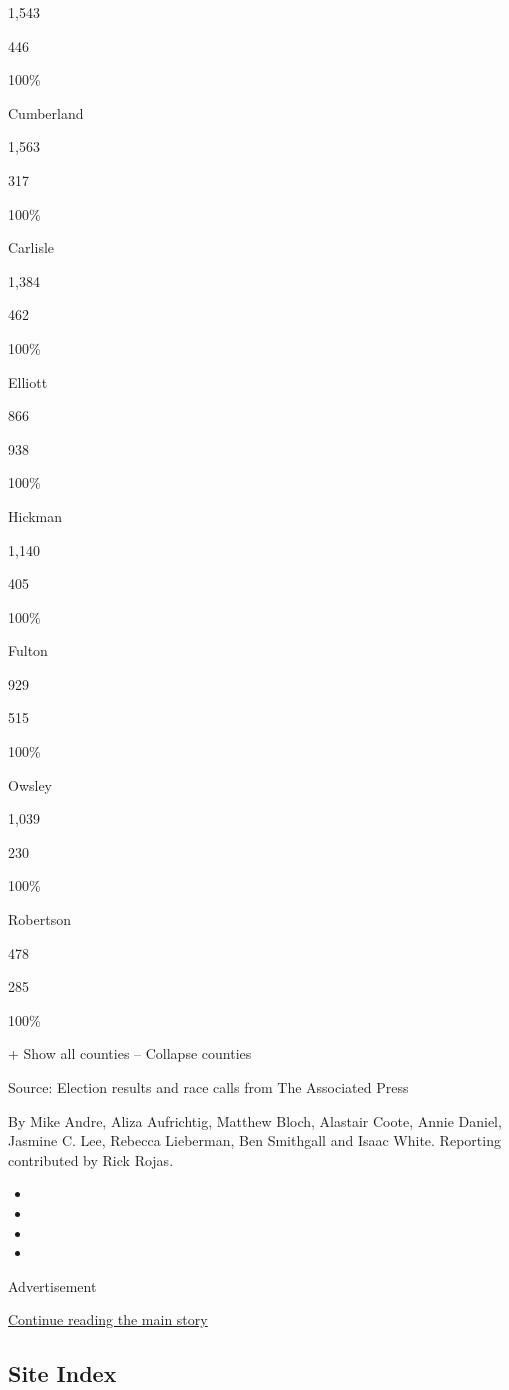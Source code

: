 1,543

446

100\%

Cumberland

1,563

317

100\%

Carlisle

1,384

462

100\%

Elliott

866

938

100\%

Hickman

1,140

405

100\%

Fulton

929

515

100\%

Owsley

1,039

230

100\%

Robertson

478

285

100\%

+ Show all counties -- Collapse counties

Source: Election results and race calls from The Associated Press

By Mike Andre, Aliza Aufrichtig, Matthew Bloch, Alastair Coote, Annie
Daniel, Jasmine C. Lee, Rebecca Lieberman, Ben Smithgall and Isaac
White. Reporting contributed by Rick Rojas.

\begin{itemize}
\item
\item
\item
\item
\end{itemize}

Advertisement

\protect\hyperlink{after-bottom}{Continue reading the main story}

\hypertarget{site-index}{%
\subsection{Site Index}\label{site-index}}

